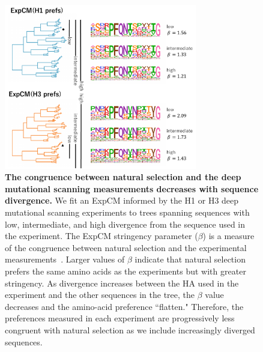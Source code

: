 \documentclass[11pt]{article}
\begin{document}
\begin{figure}[h!]
\centerline{\includegraphics[width=0.75\textwidth]{fig6.pdf}}
\caption{\label{fig:compete}
\textbf{The congruence between natural selection and the deep mutational scanning measurements decreases with sequence divergence.} 
We fit an ExpCM informed by the H1 or H3 deep mutational scanning experiments to trees spanning sequences with low, intermediate, and high divergence from the sequence used in the experiment. 
The ExpCM stringency parameter ($\beta$) is a measure of the congruence between natural selection and the experimental measurements~\citep{bloom2014informed,hilton2017phydms}. 
Larger values of $\beta$ indicate that natural selection prefers the same amino acids as the experiments but with greater stringency. 
As divergence increases between the HA used in the experiment and the other sequences in the tree, the $\beta$ value decreases and the amino-acid preference ``flatten."
Therefore, the preferences measured in each experiment are progressively less congruent with natural selection as we include increasingly diverged sequences. 
}
\end{figure}
\newpage
\end{document}
